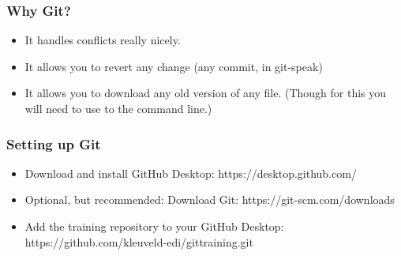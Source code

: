 \documentclass{beamer}
\begin{document}

\begin{frame}
\frametitle{Why Git?}
\begin{itemize}
\item It handles conflicts really nicely.
\item It allows you to revert any change (any commit, in git-speak)
\item It allows you to download any old version of any file. (Though for this you will need to use to the command line.)
\end{itemize}
\end{frame}


\begin{frame}
\frametitle{Setting up Git}
\begin{itemize}
\item Download and install GitHub Desktop: https://desktop.github.com/
\item Optional, but recommended: Download Git: https://git-scm.com/downloads 
\item Add the training repository to your GitHub Desktop: https://github.com/kleuveld-edi/gittraining.git
\end{itemize}
\end{frame}
\end{document}
